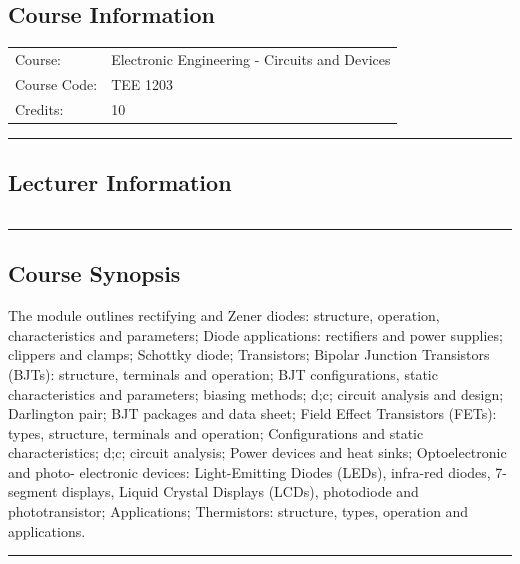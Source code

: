 
\subsection*{Course Information}
\vspace{0ex}%
\noindent\parbox{0.5\textwidth}{%
    \noindent\begin{tabular}{@{}ll}
                 \textsf{Course:}          & Electronic Engineering - Circuits and Devices \\
                 \textsf{Course Code:}         & 	TEE 1203    \\
                 \textsf{Credits:}    & 	10
    \end{tabular}}
\vspace{2ex}\hrule\vspace{2ex}

\subsection*{Lecturer Information}
\noindent\parbox{0.5\textwidth}{%
    \noindent\begin{tabular}{@{}ll}
                 
    \end{tabular}}
\vspace{2ex}\hrule\vspace{2ex}


\subsection*{Course Synopsis}
The module outlines rectifying and Zener diodes: structure, operation, characteristics and parameters; Diode applications: rectifiers and power supplies; clippers and clamps; Schottky diode; Transistors; Bipolar Junction Transistors (BJTs): structure, terminals and operation; BJT configurations, static characteristics and parameters; biasing methods; d;c; circuit analysis and design; Darlington pair; BJT packages and data sheet; Field Effect Transistors (FETs): types, structure, terminals and operation; Configurations and static characteristics; d;c; circuit analysis; Power devices and heat sinks; Optoelectronic and photo- electronic devices: Light-Emitting Diodes (LEDs), infra-red diodes, 7-segment displays, Liquid Crystal Displays (LCDs), photodiode and phototransistor; Applications; Thermistors: structure, types, operation and applications.
\vspace{2ex} \hrule\vspace{2ex}
